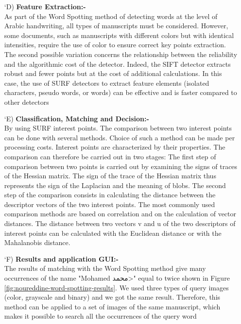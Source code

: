 \begin{itemize}[labelindent=1em,labelsep=0.25cm,leftmargin=*]
        \item[\char `D)] \textbf{Feature Extraction:-} \\
        As part of the Word Spotting method of detecting words at the level of Arabic handwriting, all types of manuscripts must be considered. However, some documents, such as manuscripts with different colors but with identical intensities, require the use of color to ensure correct key points extraction. The second possible variation concerns the relationship between the reliability and the algorithmic cost of the detector. Indeed, the SIFT detector extracts robust and fewer points but at the cost of additional calculations. In this case, the use of SURF detectors to extract feature elements (isolated characters, pseudo words, or words) can be effective and is faster compared to other detectors
        
        \item[\char `E)] \textbf{Classification, Matching and Decision:-} \\
        By using SURF interest points. The comparison between two interest points can be done with several methods. Choice of such a method can be made per processing costs. Interest points are characterized by their properties. The comparison can therefore be carried out in two stages: The first step of comparison between two points is carried out by examining the signs of traces of the Hessian matrix. The sign of the trace of the Hessian matrix thus represents the sign of the Laplacian and the meaning of blobs. The second step of the comparison consists in calculating the distance between the descriptor vectors of the two interest points. The most commonly used comparison methods are based on correlation and on the calculation of vector distances. The distance between two vectors v and u of the two descriptors of interest points can be calculated with the Euclidean distance or with the Mahalanobis distance.
        \item[\char `F)] \textbf{Results and application GUI:-} \\
        The results of matching with the Word Spotting method give many occurrences of the name "Mohamed \<محمد>" equal to twice shown in Figure \ref{fig:noureddine-word-spotting-results}. We used three types of query images (color, grayscale and binary) and we got the same result. Therefore, this method can be applied to a set of images of the same manuscript, which makes it possible to search all the occurrences of the query word


\end{itemize}

